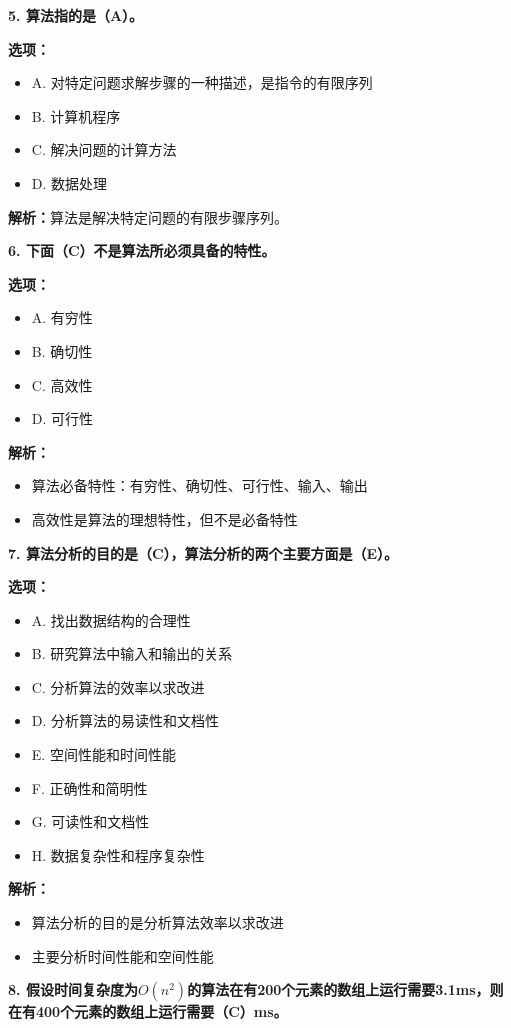\documentclass[12pt,a4paper]{amsart}
\begin{document}
\textbf{5. 算法指的是（A）。}

\textbf{选项：}
\begin{itemize}
\item A. 对特定问题求解步骤的一种描述，是指令的有限序列
\item B. 计算机程序
\item C. 解决问题的计算方法
\item D. 数据处理
\end{itemize}

\textbf{解析：}算法是解决特定问题的有限步骤序列。

\textbf{6. 下面（C）不是算法所必须具备的特性。}

\textbf{选项：}
\begin{itemize}
\item A. 有穷性
\item B. 确切性
\item C. 高效性
\item D. 可行性
\end{itemize}

\textbf{解析：}
\begin{itemize}
\item 算法必备特性：有穷性、确切性、可行性、输入、输出
\item 高效性是算法的理想特性，但不是必备特性
\end{itemize}

\textbf{7. 算法分析的目的是（C），算法分析的两个主要方面是（E）。}

\textbf{选项：}
\begin{itemize}
\item A. 找出数据结构的合理性
\item B. 研究算法中输入和输出的关系
\item C. 分析算法的效率以求改进
\item D. 分析算法的易读性和文档性
\item E. 空间性能和时间性能
\item F. 正确性和简明性
\item G. 可读性和文档性
\item H. 数据复杂性和程序复杂性
\end{itemize}

\textbf{解析：}
\begin{itemize}
\item 算法分析的目的是分析算法效率以求改进
\item 主要分析时间性能和空间性能
\end{itemize}

\textbf{8. 假设时间复杂度为$O(n^2)$的算法在有200个元素的数组上运行需要3.1ms，则在有400个元素的数组上运行需要（C）ms。}
\end{document}
